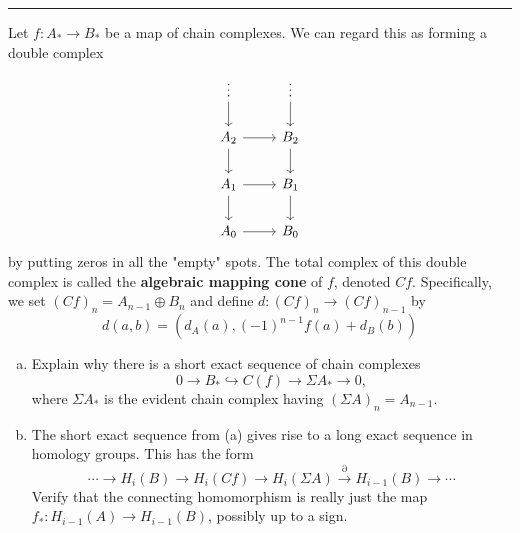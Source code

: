 \documentclass[a4paper, 12pt]{article}
\begin{document}
\noindent\rule{7in}{2.8pt}
\begin{problem}{5}
Let \(f:A_*\rightarrow B_*\) be a map of chain complexes. We can regard this as forming a double complex 
\[\begin{tikzcd}
	\vdots & \vdots \\
	{A_2} & {B_2} \\
	{A_1} & {B_1} \\
	{A_0} & {B_0}
	\arrow[from=1-1, to=2-1]
	\arrow[from=1-2, to=2-2]
	\arrow[from=2-1, to=2-2]
	\arrow[from=2-1, to=3-1]
	\arrow[from=2-2, to=3-2]
	\arrow[from=3-1, to=3-2]
	\arrow[from=3-1, to=4-1]
	\arrow[from=3-2, to=4-2]
	\arrow[from=4-1, to=4-2]
\end{tikzcd}\]
by putting zeros in all the "empty" spots. The total complex of this double complex is called the \textbf{algebraic mapping cone} of \(f\), denoted \(Cf\). Specifically, we set \((Cf)_n=A_{n-1}\oplus B_n\) and define \(d:(Cf)_n\rightarrow (Cf)_{n-1}\) by 
\[d(a,b)=(d_A(a), (-1)^{n-1}f(a)+d_B(b))\]
\begin{enumerate}[(a)]
\item Explain why there is a short exact sequence of chain complexes 
\[0\rightarrow B_*\hookrightarrow C(f)\rightarrow \Sigma A_*\rightarrow 0,\]
where \(\Sigma A_*\) is the evident chain complex having \((\Sigma A)_n=A_{n-1}\). 
\item The short exact sequence from (a) gives rise to a long exact sequence in homology groups. This has the form 
\[\cdots \rightarrow H_i(B)\rightarrow H_i(Cf)\rightarrow H_i(\Sigma A)\xrightarrow{\partial}H_{i-1}(B)\rightarrow \cdots\]
Verify that the connecting homomorphism is really just the map \(f_*:H_{i-1}(A)\rightarrow H_{i-1}(B)\), possibly up to a sign. 
\end{enumerate}
\end{problem}
\begin{solution}

\end{solution}
\end{document}
